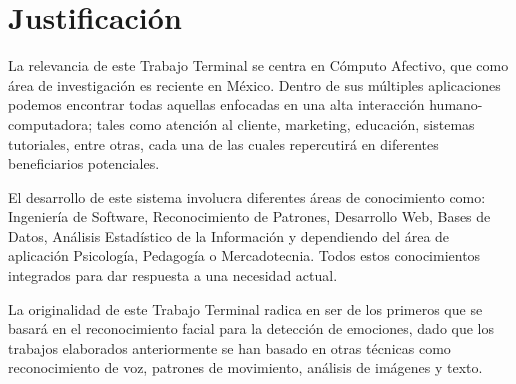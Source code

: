 \section{Justificación}
\noindent
La relevancia de este Trabajo Terminal se centra en Cómputo Afectivo, que como área de investigación es reciente en México. Dentro de sus múltiples aplicaciones podemos encontrar todas aquellas enfocadas en una alta interacción humano-computadora; tales como atención al cliente, marketing, educación, sistemas tutoriales, entre otras, cada una de las cuales repercutirá en diferentes beneficiarios potenciales.
\par
El desarrollo de este sistema involucra diferentes áreas de conocimiento como: Ingeniería de Software, Reconocimiento de Patrones, Desarrollo Web, Bases de Datos, Análisis Estadístico de la Información y dependiendo del área de aplicación Psicología, Pedagogía o Mercadotecnia. Todos estos conocimientos integrados para dar respuesta a una necesidad actual.
\par
La originalidad de este Trabajo Terminal radica en ser de los primeros que se basará en el reconocimiento facial para la detección de emociones, dado que los trabajos elaborados anteriormente se han basado en otras técnicas como reconocimiento de voz, patrones de movimiento, análisis de imágenes y texto.

  